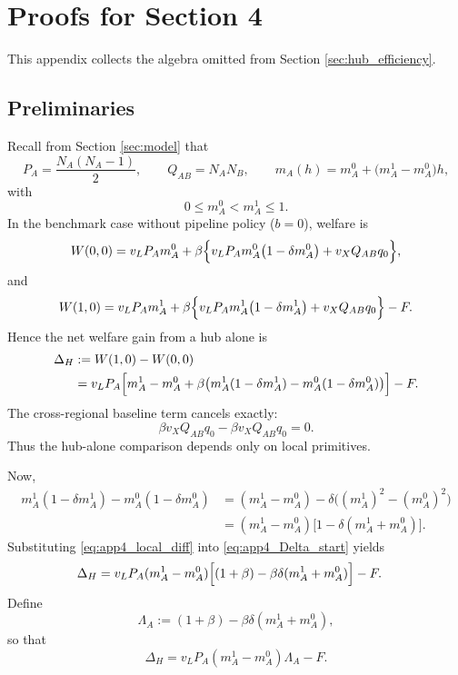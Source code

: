 \section{Proofs for Section 4}

This appendix collects the algebra omitted from Section \ref{sec:hub_efficiency}.

\subsection{Preliminaries}

Recall from Section \ref{sec:model} that
\[
P_A=\frac{N_A(N_A-1)}{2},
\qquad
Q_{AB}=N_A N_B,
\qquad
m_A(h)=m_A^0+\bigl(m_A^1-m_A^0\bigr)h,
\]
with
\[
0\le m_A^0<m_A^1\le 1.
\]
In the benchmark case without pipeline policy ($b=0$), welfare is
\begin{equation}
W(0,0)
=
v_L P_A m_A^0
+
\beta\Bigl\{
v_L P_A m_A^0\bigl(1-\delta m_A^0\bigr)
+
v_X Q_{AB}q_0
\Bigr\},
\label{eq:app4_W00}
\end{equation}
and
\begin{equation}
W(1,0)
=
v_L P_A m_A^1
+
\beta\Bigl\{
v_L P_A m_A^1\bigl(1-\delta m_A^1\bigr)
+
v_X Q_{AB}q_0
\Bigr\}
-F.
\label{eq:app4_W10}
\end{equation}
Hence the net welfare gain from a hub alone is
\begin{align}
\Delta_H
&:=W(1,0)-W(0,0)
\nonumber\\
&=
v_L P_A\Bigl[
m_A^1-m_A^0
+
\beta\bigl(
m_A^1(1-\delta m_A^1)-m_A^0(1-\delta m_A^0)
\bigr)
\Bigr]-F.
\label{eq:app4_Delta_start}
\end{align}
The cross-regional baseline term cancels exactly:
\[
\beta v_XQ_{AB}q_0-\beta v_XQ_{AB}q_0=0.
\]
Thus the hub-alone comparison depends only on local primitives.

Now,
\begin{align}
m_A^1(1-\delta m_A^1)-m_A^0(1-\delta m_A^0)
&=
(m_A^1-m_A^0)-\delta\bigl((m_A^1)^2-(m_A^0)^2\bigr)
\nonumber\\
&=
(m_A^1-m_A^0)\bigl[1-\delta(m_A^1+m_A^0)\bigr].
\label{eq:app4_local_diff}
\end{align}
Substituting \eqref{eq:app4_local_diff} into \eqref{eq:app4_Delta_start} yields
\begin{align}
\Delta_H
&=
v_L P_A(m_A^1-m_A^0)
\Bigl[(1+\beta)-\beta\delta(m_A^1+m_A^0)\Bigr]-F.
\label{eq:app4_Delta_factorized}
\end{align}
Define
\begin{equation}
\Lambda_A:=(1+\beta)-\beta\delta(m_A^1+m_A^0),
\label{eq:app4_Lambda}
\end{equation}
so that
\begin{equation}
\Delta_H=v_L P_A(m_A^1-m_A^0)\Lambda_A-F.
\label{eq:app4_Delta_Lambda}
\end{equation}

